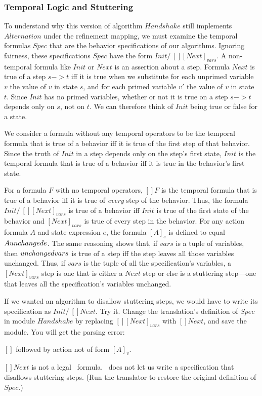 \documentclass[fleqn,leqno]{article}
\begin{document}
\subsubsection{Temporal Logic and Stuttering} 

\begin{sloppypar}
To understand why this version of algorithm $Handshake$ still
implements $Alternation$ under the refinement mapping, we must examine
the temporal formulas $Spec$ that are the behavior specifications of
our algorithms.  Ignoring fairness, these specifications $Spec$ have
the form $Init /\ [][Next]_{vars}$.  A non-temporal formula like
$Init$ or $Next$ is an assertion about a step.  Formula $Next$ is true
of a step $s->t$ iff it is true when we substitute for each unprimed
variable $v$ the value of $v$ in state $s$, and for each primed
variable $v'$ the value of $v$ in state $t$.  Since $Init$ has no
primed variables, whether or not it is true on a step $s -> t$ 
depends only on $s$, not on $t$.  We can therefore think of $Init$
being true or false for a state.
\end{sloppypar}

We consider a formula without any temporal operators to be the
temporal formula that is true of a behavior iff it is true of the
first step of that behavior.  Since the truth of $Init$ in a step
depends only on the step's first state, $Init$ is the temporal formula
that is true of a behavior iff it is true in the behavior's first
state.

For a formula $F$ with no temporal operators, $[]F$ is the temporal
formula that is true of a behavior iff it is true of \emph{every} step
of the behavior.  Thus, the formula $Init /\ [][Next]_{vars}$ is true
of a behavior iff $Init$ is true of the first state of the behavior
and $[Next]_{vars}$ is true of every step in the behavior.  For any
action formula $A$ and state expression $e$, the formula $[A]_{e}$
is defined to equal $A \/ \UNCHANGED e$.  The same reasoning 
shows that, if $vars$ is a tuple of variables, then 
  $\UNCHANGED vars$
is true of a step iff the step leaves all those variables unchanged.
Thus, if $vars$ is the tuple of all the specification's variables, a
$[Next]_{vars}$ step is one that is either a $Next$ step or else is a
stuttering step---one that leaves all the specification's variables
unchanged.

If we wanted an algorithm to disallow stuttering steps, we would
have to write its specification as $Init /\ []Next$.  Try it.  Change the
translation's definition of $Spec$ in module $Handshake$ by replacing
$[][Next]_{vars}$ with $[]Next$, and save the module.  You will get
the parsing error:
\begin{display}
$[]$ followed by action not of form $[A]_{v}$.
\end{display}
$[]Next$ is not a legal \tlaplus\ formula.  \tlaplus\ does not let
us write a specification that disallows stuttering steps.  (Run the
translator to restore the original definition of $Spec$.)
\end{document}
